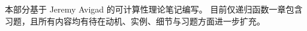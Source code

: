 \documentclass[../../include/open-logic-part]{subfiles}
\begin{document}

\begin{editorial}
本部分基于 Jeremy Avigad 的可计算性理论笔记编写。
  目前仅递归函数一章包含习题，且所有内容均有待在动机、实例、细节与习题方面进一步扩充。
\end{editorial}



\OLEndPartHook
\end{document}
